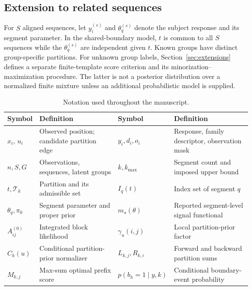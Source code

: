 \subsection{Extension to related sequences}
For $S$ aligned sequences, let $y^{(s)}_i$ and $\theta^{(s)}_q$ denote the
subject response and its segment parameter. In the shared-boundary model,
$t$ is common to all $S$ sequences while the $\theta^{(s)}_q$ are independent
given $t$. Known groups have distinct group-specific partitions. For unknown
group labels, Section~\ref{sec:extensions} defines a separate finite-template
score criterion and its minorization--maximization procedure. The latter is
not a posterior distribution over a normalized finite mixture unless an
additional probabilistic model is supplied.

\begin{table}[!htbp]
\centering\small
\caption{Notation used throughout the manuscript.}
\label{tab:notation-paper}
\begin{tabularx}{0.96\textwidth}{@{}L{0.22\textwidth}Y L{0.19\textwidth}Y@{}}
\toprule
Symbol & Definition & Symbol & Definition \\
\midrule
$x_i$, $u_i$ & Observed position; candidate partition edge & $y_i,d_i,o_i$ & Response, family descriptor, observation mask \\
$n,S,G$ & Observations, sequences, latent groups & $k,k_{\max}$ & Segment count and imposed upper bound \\
$t,\mathcal T_k$ & Partition and its admissible set & $I_q(t)$ & Index set of segment $q$ \\
$\theta_q,\pi_0$ & Segment parameter and proper prior & $m_\star(\theta)$ & Reported segment-level signal functional \\
$A^{(0)}_{ij}$ & Integrated block likelihood & $\gamma_u(i,j)$ & Local partition-prior factor \\
$C_k(u)$ & Conditional partition-prior normalizer & $L_{k,j},R_{k,i}$ & Forward and backward partition sums \\
$M_{k,j}$ & Max-sum optimal prefix score & $p(b_h=1\mid y,k)$ & Conditional boundary-event probability \\
\bottomrule
\end{tabularx}
\end{table}
